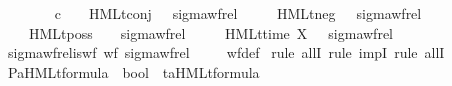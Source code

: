 \begin{isabellebody}
\ \ \isanewline
\ \ \ \ {\isacartoucheopen}{\isasymphi}\ {\isasymin}\isactrlsub c\ {\isasymPhi}\ {\isasymLongrightarrow}\ {\isacharparenleft}{\kern0pt}{\isasymphi}{\isacharcomma}{\kern0pt}\ HMLt{\isacharunderscore}{\kern0pt}conj\ {\isasymPhi}{\isacharparenright}{\kern0pt}\ {\isasymin}\ sigma{\isacharunderscore}{\kern0pt}wf{\isacharunderscore}{\kern0pt}rel{\isacartoucheclose}\ \isanewline
\ \ {\isacharbar}{\kern0pt}\ {\isacartoucheopen}{\isacharparenleft}{\kern0pt}{\isasymphi}{\isacharcomma}{\kern0pt}\ HMLt{\isacharunderscore}{\kern0pt}neg\ {\isasymphi}{\isacharparenright}{\kern0pt}\ {\isasymin}\ sigma{\isacharunderscore}{\kern0pt}wf{\isacharunderscore}{\kern0pt}rel{\isacartoucheclose}\ \isanewline
\ \ {\isacharbar}{\kern0pt}\ {\isacartoucheopen}{\isacharparenleft}{\kern0pt}{\isasymphi}{\isacharcomma}{\kern0pt}\ HMLt{\isacharunderscore}{\kern0pt}poss\ {\isasymalpha}\ {\isasymphi}{\isacharparenright}{\kern0pt}\ {\isasymin}\ sigma{\isacharunderscore}{\kern0pt}wf{\isacharunderscore}{\kern0pt}rel{\isacartoucheclose}\ \isanewline
\ \ {\isacharbar}{\kern0pt}\ {\isacartoucheopen}{\isacharparenleft}{\kern0pt}{\isasymphi}{\isacharcomma}{\kern0pt}\ HMLt{\isacharunderscore}{\kern0pt}time\ X\ {\isasymphi}{\isacharparenright}{\kern0pt}\ {\isasymin}\ sigma{\isacharunderscore}{\kern0pt}wf{\isacharunderscore}{\kern0pt}rel{\isacartoucheclose}\isanewline
\isanewline
{}\isamarkupfalse%
\ sigma{\isacharunderscore}{\kern0pt}wf{\isacharunderscore}{\kern0pt}rel{\isacharunderscore}{\kern0pt}is{\isacharunderscore}{\kern0pt}wf{\isacharcolon}{\kern0pt}\ {\isacartoucheopen}wf\ sigma{\isacharunderscore}{\kern0pt}wf{\isacharunderscore}{\kern0pt}rel{\isacartoucheclose}\ \isanewline
%
\isadelimproof
\ \ %
\endisadelimproof
%
\isatagproof
{}\isamarkupfalse%
\ wf{\isacharunderscore}{\kern0pt}def\isanewline
{}\isamarkupfalse%
\ {\isacharparenleft}{\kern0pt}rule\ allI{\isacharcomma}{\kern0pt}\ rule\ impI{\isacharcomma}{\kern0pt}\ rule\ allI{\isacharparenright}{\kern0pt}\isanewline
\ \ \isamarkupfalse%
\ P{\isacharcolon}{\kern0pt}{\isacharcolon}{\kern0pt}{\isacartoucheopen}{\isacharparenleft}{\kern0pt}{\isacharprime}{\kern0pt}a{\isacharparenright}{\kern0pt}HMLt{\isacharunderscore}{\kern0pt}formula\ {\isasymRightarrow}\ bool{\isacartoucheclose}\ \ t{\isacharcolon}{\kern0pt}{\isacharcolon}{\kern0pt}{\isacartoucheopen}{\isacharparenleft}{\kern0pt}{\isacharprime}{\kern0pt}a{\isacharparenright}{\kern0pt}HMLt{\isacharunderscore}{\kern0pt}formula{\isacartoucheclose}\isanewline
\ \ \isamarkupfalse%

\end{isabellebody}
